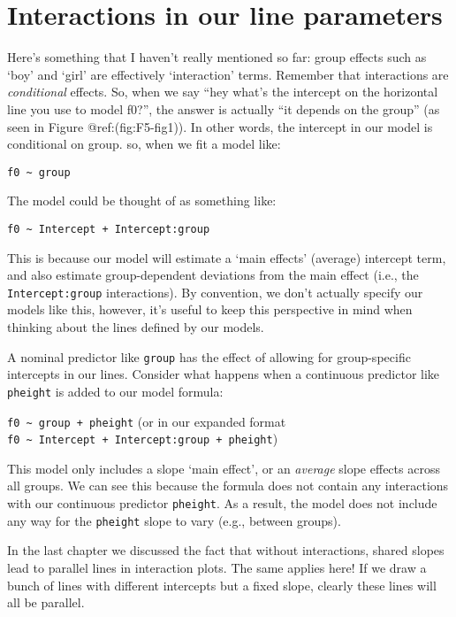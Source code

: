 \documentclass[
]{book}
\begin{document}
\hypertarget{interactions-in-our-line-parameters}{%
\section{Interactions in our line parameters}\label{interactions-in-our-line-parameters}}

Here's something that I haven't really mentioned so far: group effects such as `boy' and `girl' are effectively `interaction' terms. Remember that interactions are \emph{conditional} effects. So, when we say ``hey what's the intercept on the horizontal line you use to model f0?'', the answer is actually ``it depends on the group'' (as seen in Figure @ref:(fig:F5-fig1)). In other words, the intercept in our model is conditional on group. so, when we fit a model like:

\texttt{f0\ \textasciitilde{}\ group}

The model could be thought of as something like:

\texttt{f0\ \textasciitilde{}\ Intercept\ +\ Intercept:group}

This is because our model will estimate a `main effects' (average) intercept term, and also estimate group-dependent deviations from the main effect (i.e., the \texttt{Intercept:group} interactions). By convention, we don't actually specify our models like this, however, it's useful to keep this perspective in mind when thinking about the lines defined by our models.

A nominal predictor like \texttt{group} has the effect of allowing for group-specific intercepts in our lines. Consider what happens when a continuous predictor like \texttt{pheight} is added to our model formula:

\texttt{f0\ \textasciitilde{}\ group\ +\ pheight} (or in our expanded format \texttt{f0\ \textasciitilde{}\ Intercept\ +\ Intercept:group\ +\ pheight})

This model only includes a slope `main effect', or an \emph{average} slope effects across all groups. We can see this because the formula does not contain any interactions with our continuous predictor \texttt{pheight}. As a result, the model does not include any way for the \texttt{pheight} slope to vary (e.g., between groups).

In the last chapter we discussed the fact that without interactions, shared slopes lead to parallel lines in interaction plots. The same applies here! If we draw a bunch of lines with different intercepts but a fixed slope, clearly these lines will all be parallel.
\end{document}
